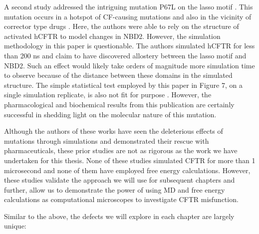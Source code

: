 A second study addressed the intriguing mutation P67L on the lasso motif \cite{sabusap2021}. This mutation occurs in a hotspot of CF-causing mutations and also in the vicinity of corrector type drugs \cite{gene2008, fiedorczuk2022}. Here, the authors were able to rely on the structure of activated hCFTR to model changes in NBD2. However, the simulation methodology in this paper is questionable. The authors simulated hCFTR for less than 200 ns and claim to have discovered allostery between the lasso motif and NBD2. Such an effect would likely take orders of magnitude more simulation time to observe because of the distance between these domains in the simulated structure. The simple statistical test employed by this paper in Figure 7, on a single simulation replicate, is also not fit for purpose \cite{knapp2018}. However, the pharmacological and biochemical results from this publication are certainly successful in shedding light on the molecular nature of this mutation.

Although the authors of these works have seen the deleterious effects of mutations through simulations and demonstrated their rescue with pharmaceuticals, these prior studies are not as rigorous as the work we have undertaken for this thesis. None of these studies simulated CFTR for more than 1 microsecond and none of them have employed free energy calculations. However, these studies validate the approach we will use for subsequent chapters and further, allow us to demonstrate the power of using MD and free energy calculations as computational microscopes to investigate CFTR misfunction. 

Similar to the above, the defects we will explore in each chapter are largely unique: 

